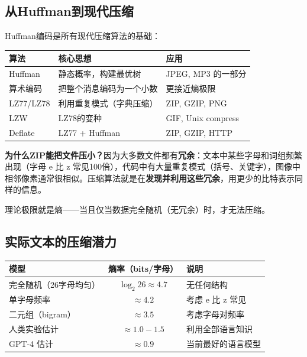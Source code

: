 \subsection{从Huffman到现代压缩}

Huffman编码是所有现代压缩算法的基础：

\begin{center}
\renewcommand{\arraystretch}{1.4}
\begin{tabular}{l|l|l}
\toprule
\textbf{算法} & \textbf{核心思想} & \textbf{应用} \\
\midrule
Huffman & 静态概率，构建最优树 & JPEG, MP3 的一部分 \\
算术编码 & 把整个消息编码为一个小数 & 更接近熵极限 \\
LZ77/LZ78 & 利用重复模式（字典压缩） & ZIP, GZIP, PNG \\
LZW & LZ78的变种 & GIF, Unix compress \\
Deflate & LZ77 + Huffman & ZIP, GZIP, HTTP \\
\bottomrule
\end{tabular}
\end{center}

\begin{physicalmeaning}
\textbf{为什么ZIP能把文件压小？}因为大多数文件都有\textbf{冗余}：文本中某些字母和词组频繁出现（字母 e 比 z 常见100倍），代码中有大量重复模式（括号、关键字），图像中相邻像素通常很相似。压缩算法就是在\textbf{发现并利用这些冗余}，用更少的比特表示同样的信息。

理论极限就是熵——当且仅当数据完全随机（无冗余）时，才无法压缩。
\end{physicalmeaning}

\subsection{实际文本的压缩潜力}

\begin{center}
\renewcommand{\arraystretch}{1.3}
\begin{tabular}{l|c|l}
\toprule
\textbf{模型} & \textbf{熵率（bits/字母）} & \textbf{说明} \\
\midrule
完全随机（26字母均匀） & $\log_2 26 \approx 4.7$ & 无任何结构 \\
单字母频率 & $\approx 4.2$ & 考虑 e 比 z 常见 \\
二元组（bigram） & $\approx 3.5$ & 考虑字母对频率 \\
人类实验估计 & $\approx 1.0 - 1.5$ & 利用全部语言知识 \\
GPT-4 估计 & $\approx 0.9$ & 当前最好的语言模型 \\
\bottomrule
\end{tabular}
\end{center}

